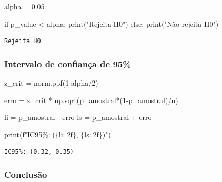 \documentclass[
  letterpaper,
  DIV=11,
  numbers=noendperiod]{scrreprt}
\newenvironment{Shaded}{\begin{snugshade}}{\end{snugshade}}
\newcommand{\BuiltInTok}[1]{\textcolor[rgb]{0.00,0.23,0.31}{#1}}
\newcommand{\ControlFlowTok}[1]{\textcolor[rgb]{0.00,0.23,0.31}{#1}}
\newcommand{\DecValTok}[1]{\textcolor[rgb]{0.68,0.00,0.00}{#1}}
\newcommand{\FloatTok}[1]{\textcolor[rgb]{0.68,0.00,0.00}{#1}}
\newcommand{\NormalTok}[1]{\textcolor[rgb]{0.00,0.23,0.31}{#1}}
\newcommand{\OperatorTok}[1]{\textcolor[rgb]{0.37,0.37,0.37}{#1}}
\newcommand{\SpecialCharTok}[1]{\textcolor[rgb]{0.37,0.37,0.37}{#1}}
\newcommand{\SpecialStringTok}[1]{\textcolor[rgb]{0.13,0.47,0.30}{#1}}
\newcommand{\StringTok}[1]{\textcolor[rgb]{0.13,0.47,0.30}{#1}}
\begin{document}
\begin{Shaded}
\begin{Highlighting}[]
\NormalTok{alpha }\OperatorTok{=} \FloatTok{0.05} 

\ControlFlowTok{if}\NormalTok{ p\_value }\OperatorTok{\textless{}}\NormalTok{ alpha: }
  \BuiltInTok{print}\NormalTok{(}\StringTok{"Rejeita H0"}\NormalTok{) }
\ControlFlowTok{else}\NormalTok{: }
  \BuiltInTok{print}\NormalTok{(}\StringTok{"Não rejeita H0"}\NormalTok{)}
\end{Highlighting}
\end{Shaded}

\begin{verbatim}
Rejeita H0
\end{verbatim}

\subsubsection{Intervalo de confiança de
95\%}\label{intervalo-de-confianuxe7a-de-95-2}

\begin{Shaded}
\begin{Highlighting}[]
\NormalTok{z\_crit }\OperatorTok{=}\NormalTok{ norm.ppf(}\DecValTok{1}\OperatorTok{{-}}\NormalTok{alpha}\OperatorTok{/}\DecValTok{2}\NormalTok{)}

\NormalTok{erro }\OperatorTok{=}\NormalTok{ z\_crit }\OperatorTok{*}\NormalTok{ np.sqrt(p\_amostral}\OperatorTok{*}\NormalTok{(}\DecValTok{1}\OperatorTok{{-}}\NormalTok{p\_amostral)}\OperatorTok{/}\NormalTok{n)}

\NormalTok{li }\OperatorTok{=}\NormalTok{ p\_amostral }\OperatorTok{{-}}\NormalTok{ erro}
\NormalTok{ls }\OperatorTok{=}\NormalTok{ p\_amostral }\OperatorTok{+}\NormalTok{ erro}

\BuiltInTok{print}\NormalTok{(}\SpecialStringTok{f"IC95\%: (}\SpecialCharTok{\{}\NormalTok{li}\SpecialCharTok{:.2f\}}\SpecialStringTok{, }\SpecialCharTok{\{}\NormalTok{ls}\SpecialCharTok{:.2f\}}\SpecialStringTok{)"}\NormalTok{)}
\end{Highlighting}
\end{Shaded}

\begin{verbatim}
IC95%: (0.32, 0.35)
\end{verbatim}

\subsubsection{Conclusão}\label{conclusuxe3o-1}
\end{document}
